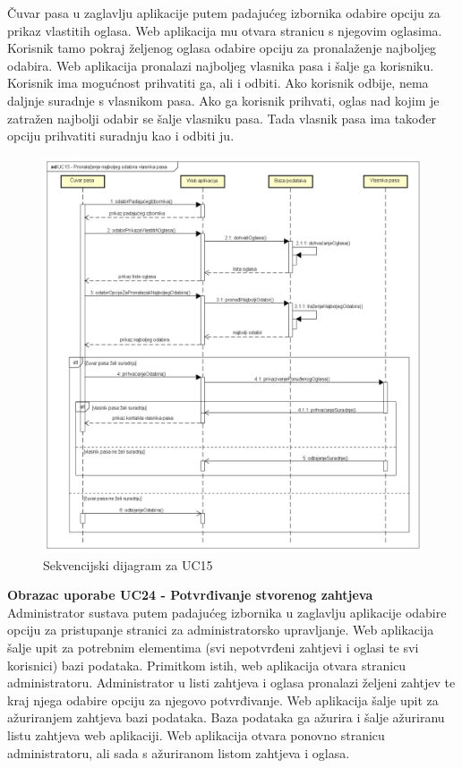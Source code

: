 				Čuvar pasa u zaglavlju aplikacije putem padajućeg izbornika odabire opciju za prikaz vlastitih oglasa. Web aplikacija mu otvara stranicu s njegovim oglasima. Korisnik tamo pokraj željenog oglasa odabire opciju za pronalaženje najboljeg odabira. Web aplikacija pronalazi najboljeg vlasnika pasa i šalje ga korisniku. Korisnik ima mogućnost prihvatiti ga, ali i odbiti. Ako korisnik odbije, nema daljnje suradnje s vlasnikom pasa. Ako ga korisnik prihvati, oglas nad kojim je zatražen najbolji odabir se šalje vlasniku pasa. Tada vlasnik pasa ima također opciju prihvatiti suradnju kao i odbiti ju.
				
				\begin{figure}[htb]
					\centering
					\includegraphics[width=14cm]{slike/Sekvencijski dijagram - UC15}
					\caption{Sekvencijski dijagram za UC15}
					\label{fig:Sekvencijski-UC15}
				\end{figure}
				\eject		
				
				\textbf{Obrazac uporabe UC24 - Potvrđivanje stvorenog zahtjeva}\\
				
				Administrator sustava putem padajućeg izbornika u zaglavlju aplikacije odabire opciju za pristupanje stranici za administratorsko upravljanje. Web aplikacija šalje upit za potrebnim elementima (svi nepotvrđeni zahtjevi i oglasi te svi korisnici) bazi podataka. Primitkom istih, web aplikacija otvara stranicu administratoru. Administrator u listi zahtjeva i oglasa pronalazi željeni zahtjev te kraj njega odabire opciju za njegovo potvrđivanje. Web aplikacija šalje upit za ažuriranjem zahtjeva bazi podataka. Baza podataka ga ažurira i šalje ažuriranu listu zahtjeva web aplikaciji. Web aplikacija otvara ponovno stranicu administratoru, ali sada s ažuriranom listom zahtjeva i oglasa.
				
